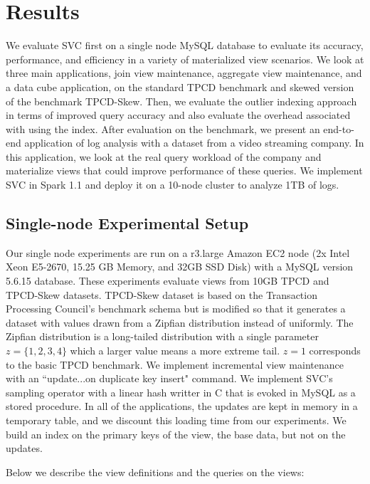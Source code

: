 \vspace{-.5em}
\section{Results}
\label{exp}
We evaluate SVC first on a single node MySQL database to evaluate its accuracy, performance, and efficiency in a variety of materialized view 
scenarios.
We look at three main applications, join view maintenance, aggregate view maintenance, and a data cube application, on the standard TPCD benchmark 
and skewed version of the benchmark TPCD-Skew.
Then, we evaluate the outlier indexing approach in terms of improved query accuracy and also evaluate the overhead associated with using the index.
After evaluation on the benchmark, we present an end-to-end application of log analysis with a dataset from a video streaming company.
In this application, we look at the real query workload of the company and materialize views that could improve performance of these queries.
We implement SVC in Spark 1.1 and deploy it on a 10-node cluster to analyze 1TB of logs.

\subsection{Single-node Experimental Setup}
Our single node experiments are run on a r3.large Amazon EC2 node (2x Intel Xeon E5-2670, 15.25 GB Memory, and 32GB SSD Disk) with a MySQL version 5.6.15 database.
These experiments evaluate views from 10GB TPCD and TPCD-Skew datasets.
TPCD-Skew dataset \cite{tpcdskew} is based on the Transaction Processing Council's benchmark
schema but is modified so that it generates a dataset with values drawn from a Zipfian distribution instead of uniformly.
The Zipfian distribution \cite{mitzenmacher2004brief} is a long-tailed distribution with a single parameter $z=\{1,2,3,4\}$ which a larger
value means a more extreme tail.
$z=1$ corresponds to the basic TPCD benchmark. 
We implement incremental view maintenance with an ``update...on duplicate key insert" command.
We implement SVC's sampling operator with a linear hash writter in C that is evoked in MySQL as a stored procedure.
In all of the applications, the updates are kept in memory in a temporary table, and we discount this loading time from our experiments.
We build an index on the primary keys of the view, the base data, but not on the updates.

Below we describe the view definitions and the queries on the views:

